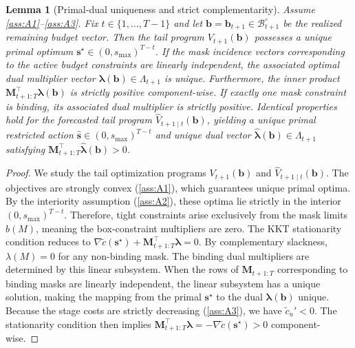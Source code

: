 \documentclass{uai2026} %
\newtheorem{lemma}{Lemma}
\newcommand{\1}{\mathbf{1}}
\newcommand{\bcal}{\mathcal{B}}
\begin{document}
\begin{lemma}[Primal-dual uniqueness and strict complementarity]
  \label{lem:dual-unique-app}
  Assume \ref{ass:A1}--\ref{ass:A3}. Fix $t \in \{1,\dots,T-1\}$ and let $\mathbf{b} = \mathbf{b}_{t+1} \in \bcal_{t+1}^\circ$ be the realized remaining budget vector.
  Then the tail program $V_{t+1}(\mathbf{b})$ possesses a unique primal optimum $\mathbf{s}^{\star} \in (0,s_{\max})^{T-t}$.
  If the mask incidence vectors corresponding to the active budget constraints are linearly independent, the associated optimal dual multiplier vector $\boldsymbol{\lambda}(\mathbf{b}) \in \Lambda_{t+1}$ is unique.
  Furthermore, the inner product $\mathbf{M}_{t+1:T}^\top \boldsymbol{\lambda}(\mathbf{b})$ is strictly positive component-wise. If exactly one mask constraint is binding, its associated dual multiplier is strictly positive.
  Identical properties hold for the forecasted tail program $\hat{V}_{t+1\mid t}(\mathbf{b})$, yielding a unique primal restricted action $\hat{\mathbf{s}} \in (0,s_{\max})^{T-t}$ and unique dual vector $\hat{\boldsymbol{\lambda}}(\mathbf{b}) \in \Lambda_{t+1}$ satisfying $\mathbf{M}_{t+1:T}^\top \hat{\boldsymbol{\lambda}}(\mathbf{b}) > 0$.
\end{lemma}
\begin{proof}
  We study the tail optimization programs $V_{t+1}(\mathbf{b})$ and $\hat{V}_{t+1\mid t}(\mathbf{b})$. The objectives are strongly convex (\ref{ass:A1}), which guarantees unique primal optima.
  By the interiority assumption (\ref{ass:A2}), these optima lie strictly in the interior $(0, s_{\max})^{T-t}$. Therefore, tight constraints arise exclusively from the mask limits $b(M)$, meaning the box-constraint multipliers are zero.
  The KKT stationarity condition reduces to $\nabla \tilde{c}(\mathbf{s}^\star) + \mathbf{M}_{t+1:T}^\top \boldsymbol{\lambda} = 0$. By complementary slackness, $\lambda(M) = 0$ for any non-binding mask.
  The binding dual multipliers are determined by this linear subsystem. When the rows of $\mathbf{M}_{t+1:T}$ corresponding to binding masks are linearly independent, the linear subsystem has a unique solution, making the mapping from the primal $\mathbf{s}^\star$ to the dual $\boldsymbol{\lambda}(\mathbf{b})$ unique.
  Because the stage costs are strictly decreasing (\ref{ass:A3}), we have $\tilde{c}_u' < 0$. The stationarity condition then implies $\mathbf{M}_{t+1:T}^\top \boldsymbol{\lambda} = -\nabla \tilde{c}(\mathbf{s}^\star) > 0$ component-wise.
\end{proof}
\end{document}
